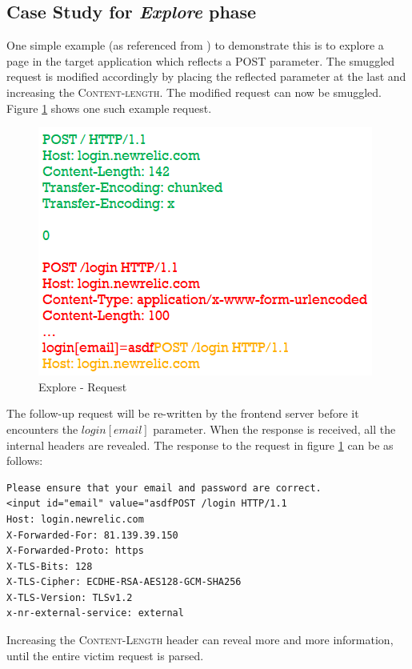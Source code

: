 \subsection{Case Study for \textit{Explore} phase}
One simple example (as referenced from \cite{b6}) to demonstrate this is to explore a page in the target application which reflects a POST parameter. The smuggled request is modified accordingly by placing the reflected parameter at the last and increasing the \textsc{Content-length}. The modified request can now be smuggled. Figure \ref{fig:Explore_Request} shows one such example request.\\ 
\begin{figure}
	\includegraphics{images/Explore_Request}
	\caption{Explore - Request}
	\label{fig:Explore_Request}
\end{figure}
The follow-up request will be re-written by the frontend server before it encounters the $login[email]$ parameter. When the response is received, all the internal headers are revealed. 
The response to the request in figure \ref{fig:Explore_Request} can be as follows:
\begin{verbatim}
Please ensure that your email and password are correct.
<input id="email" value="asdfPOST /login HTTP/1.1
Host: login.newrelic.com
X-Forwarded-For: 81.139.39.150
X-Forwarded-Proto: https
X-TLS-Bits: 128
X-TLS-Cipher: ECDHE-RSA-AES128-GCM-SHA256
X-TLS-Version: TLSv1.2
x-nr-external-service: external
\end{verbatim}
Increasing the \textsc{Content-Length} header can reveal more and more information, until the entire victim request is parsed. 


